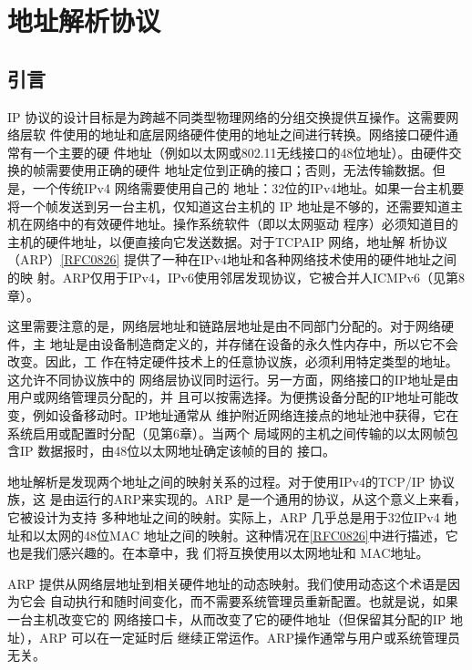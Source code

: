 \chapter{地址解析协议}
\minitoc

\section{引言}

IP 协议的设计目标是为跨越不同类型物理网络的分组交换提供互操作。这需要网络层软
件使用的地址和底层网络硬件使用的地址之间进行转换。网络接口硬件通常有一个主要的硬
件地址（例如以太网或802.11无线接口的48位地址）。由硬件交换的帧需要使用正确的硬件
地址定位到正确的接口；否则，无法传输数据。但是，一个传统IPv4 网络需要使用自己的
地址：32位的IPv4地址。如果一台主机要将一个帧发送到另一台主机，仅知道这台主机的
IP 地址是不够的，还需要知道主机在网络中的有效硬件地址。操作系统软件（即以太网驱动
程序）必须知道目的主机的硬件地址，以便直接向它发送数据。对于TCPAIP 网络，地址解
析协议（ARP）\href{https://www.rfc-editor.org/rfc/rfc0826}{[RFC0826]} 提供了一种在IPv4地址和各种网络技术使用的硬件地址之间的映
射。ARP仅用于IPv4，IPv6使用邻居发现协议，它被合并人ICMPv6（见第8章）。

这里需要注意的是，网络层地址和链路层地址是由不同部门分配的。对于网络硬件，主
地址是由设备制造商定义的，并存储在设备的永久性内存中，所以它不会改变。因此，工
作在特定硬件技术上的任意协议族，必须利用特定类型的地址。这允许不同协议族中的
网络层协议同时运行。另一方面，网络接口的IP地址是由用户或网络管理员分配的，并
且可以按需选择。为便携设备分配的IP地址可能改变，例如设备移动时。IP地址通常从
维护附近网络连接点的地址池中获得，它在系统启用或配置时分配（见第6章）。当两个
局域网的主机之间传输的以太网帧包含IP 数据报时，由48位以太网地址确定该帧的目的
接口。

地址解析是发现两个地址之间的映射关系的过程。对于使用IPv4的TCP/IP 协议族，这
是由运行的ARP来实现的。ARP 是一个通用的协议，从这个意义上来看，它被设计为支持
多种地址之间的映射。实际上，ARP 几乎总是用于32位IPv4 地址和以太网的48位MAC
地址之间的映射。这种情况在\href{https://www.rfc-editor.org/rfc/rfc0826}{[RFC0826]}中进行描述，它也是我们感兴趣的。在本章中，我
们将互换使用以太网地址和 MAC地址。

ARP 提供从网络层地址到相关硬件地址的动态映射。我们使用动态这个术语是因为它会
自动执行和随时间变化，而不需要系统管理员重新配置。也就是说，如果一台主机改变它的
网络接口卡，从而改变了它的硬件地址（但保留其分配的IP 地址），ARP 可以在一定延时后
继续正常运作。ARP操作通常与用户或系统管理员无关。

